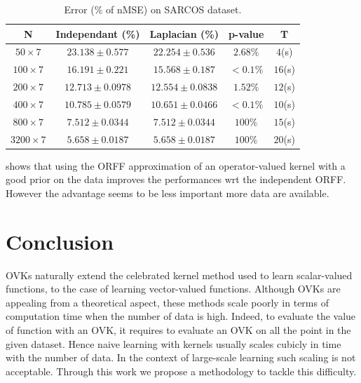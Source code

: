 \documentclass[twoside,11pt]{article}
\begin{document}
\begin{table}
    \centering
    \begin{tabular}{c|cccc}
        \toprule
            N & Independant (\%) & Laplacian (\%)& p-value & T \\
        \midrule
            $50\times 7$ & $23.138 \pm 0.577$ & $22.254\pm 0.536$ & $2.68\%$ &
            $4$(s) \\
            $100\times 7$ & $16.191 \pm 0.221$ & $15.568 \pm 0.187$ & $<0.1\%$
            & $16$(s) \\
            $200\times 7$ & $12.713 \pm 0.0978$ & $12.554 \pm 0.0838$ &
            $1.52\%$ & $12$(s) \\
            $400\times 7$ & $10.785 \pm 0.0579$ & $10.651 \pm 0.0466$ & $<
            0.1\%$ & $10$(s) \\
            $800\times 7$ & $7.512\pm 0.0344$ & $7.512\pm 0.0344$ & $100\%$ &
            $15$(s) \\
            $3200\times 7$ & $5.658 \pm 0.0187$ & $5.658 \pm 0.0187$ & $100\%$
            & $20$(s) \\
        \bottomrule
    \end{tabular}
    \caption{Error (\% of nMSE) on SARCOS dataset.}
    \label{table:sarcos}
\end{table}
 shows that using the \acs{ORFF} approximation of an
operator-valued kernel with a good prior on the data improves the performances
\acs{wrt} the independent \acs{ORFF}. However the advantage seems to be less
important more data are available.


\section{Conclusion}
\label{sec:conclusion}
\acsp{OVK} naturally extend the celebrated kernel method used to learn
scalar-valued functions, to the case of learning vector-valued functions.
Although \acsp{OVK} are appealing from a theoretical aspect, these methods
scale poorly in terms of computation time when the number of data is high.
Indeed, to evaluate the value of function with an \acl{OVK}, it requires to
evaluate an \acl{OVK} on all the point in the given dataset.  Hence naive
learning with kernels usually scales cubicly in time with the number of data.
In the context of large-scale learning such scaling is not acceptable. Through
this work we propose a methodology to tackle this difficulty.
\end{document}
